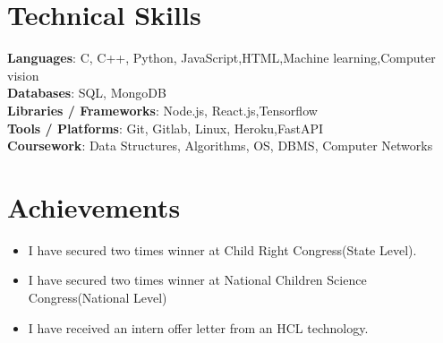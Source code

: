 \documentclass[letterpaper,11pt]{article}
\newcommand{\resumeItem}[1]{
  \item\small{
    {#1 \vspace{-2pt}}
  }
}
\newcommand{\resumeSubHeadingListStart}{\begin{itemize}[leftmargin=0.0in, label={}]}
\newcommand{\resumeSubHeadingListEnd}{\end{itemize}}
\newcommand{\resumeItemListStart}{\begin{itemize}}
\newcommand{\resumeItemListEnd}{\end{itemize}\vspace{-5pt}}
\begin{document}
\section{Technical Skills}
 \begin{itemize}[leftmargin=0.15in, label={}]
    \small{\item{
     \textbf{Languages}{:  C, C++, Python, JavaScript,HTML,Machine learning,Computer vision} \\
     \textbf{Databases}{: SQL, MongoDB } \\
     \textbf{Libraries / Frameworks}{:  Node.js, React.js,Tensorflow} \\
     \textbf{Tools / Platforms}{:  Git, Gitlab, Linux, Heroku,FastAPI} \\
     \textbf{Coursework}{: Data Structures, Algorithms, OS, DBMS, Computer Networks} \\
    }}
 \end{itemize}
\section{Achievements}
    \resumeSubHeadingListStart
            \resumeItemListStart
                \resumeItem{ I have secured two times winner at Child Right Congress(State Level).}
                \resumeItem{I have secured two times winner at National Children Science Congress(National Level)}
                \resumeItem{ I have received an intern offer letter from an HCL technology.}
            \resumeItemListEnd
        
    \resumeSubHeadingListEnd
\end{document}
